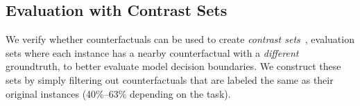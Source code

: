 







\subsection{Evaluation with Contrast Sets}
\label{subsec:contrast_set}

We verify whether \sysname counterfactuals can be used to create \emph{contrast sets}~\cite{gardner2020contrast}, \ie evaluation sets where each instance has a nearby counterfactual with a \emph{different} groundtruth, to better evaluate model decision boundaries.
We construct these sets by simply filtering out counterfactuals that are labeled the same as their original instances (40\%--63\% depending on the task).

